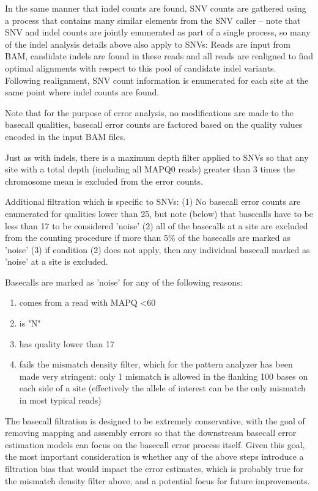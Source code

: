 \documentclass{article}
\begin{document}
In the same manner that indel counts are found, SNV counts are gathered using a process that contains many similar elements from the SNV caller -- note that SNV and indel counts are jointly enumerated as part of a single process, so many of the indel analysis details above also apply to SNVs: Reads are input from BAM, candidate indels are found in these reads and all reads are realigned to find optimal alignments with respect to this pool of candidate indel variants. Following realignment, SNV count information is enumerated for each site at the same point where indel counts are found.

Note that for the purpose of error analysis, no modifications are made to the basecall qualities, basecall error counts are factored based on the quality values encoded in the input BAM files.

Just as with indels, there is a maximum depth filter applied to SNVs so that any site with a total depth (including all MAPQ0 reads) greater than 3 times the chromosome mean is excluded from the error counts.

Additional filtration which is specific to SNVs: (1) No basecall error counts are enumerated for qualities lower than 25, but note (below) that basecalls have to be less than 17 to be considered 'noise' (2) all of the basecalls at a site are excluded from the counting procedure if more than 5\% of the basecalls are marked as 'noise' (3) if condition (2) does not apply, then any individual basecall marked as 'noise' at a site is excluded.

Basecalls are marked as 'noise' for any of the following reasons:

\begin{enumerate}
\item comes from a read with MAPQ \textless 60
\item is "N"
\item has quality lower than 17
\item fails the mismatch density filter, which for the pattern analyzer has been made very stringent: only 1 mismatch is allowed in the flanking 100 bases on each side of a site (effectively the allele of interest can be the only mismatch in most typical reads)
\end{enumerate}

The basecall filtration is designed to be extremely conservative, with the goal of removing mapping and assembly errors so that the downstream basecall error estimation models can focus on the basecall error process itself. Given this goal, the most important consideration is whether any of the above steps introduce a filtration bias that would impact the error estimates, which is probably true for the mismatch density filter above, and a potential focus for future improvements.
\end{document}
